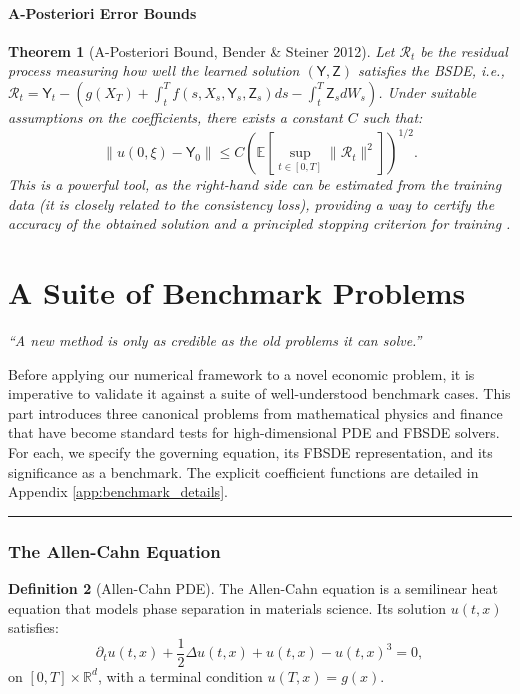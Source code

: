 \documentclass[11pt,letterpaper,oneside]{article}
\theoremstyle{plain}
\newtheorem{theorem}{Theorem}[section]
\theoremstyle{definition}
\newtheorem{definition}[theorem]{Definition}
\theoremstyle{remark}
\begin{document}
\subsection{A-Posteriori Error Bounds}
\begin{theorem}[A-Posteriori Bound, Bender \& Steiner 2012]
Let \(\mathcal{R}_t\) be the residual process measuring how well the learned solution \((\mathsf{Y}, \mathsf{Z})\) satisfies the BSDE, i.e., \(\mathcal{R}_t = \mathsf{Y}_t - \left( g(X_T) + \int_t^T f(s, X_s, \mathsf{Y}_s, \mathsf{Z}_s) ds - \int_t^T \mathsf{Z}_s dW_s \right)\). Under suitable assumptions on the coefficients, there exists a constant \(C\) such that:
\[
  \|u(0,\xi)-\mathsf{Y}_0\| \le C \left( \mathbb{E}\left[\sup_{t\in [0,T]}\|\mathcal{R}_t\|^2\right] \right)^{1/2}.
\]
This is a powerful tool, as the right-hand side can be estimated from the training data (it is closely related to the consistency loss), providing a way to certify the accuracy of the obtained solution and a principled stopping criterion for training \cite{BenderSteiner2012}.
\end{theorem}

\clearpage
\newpage
\part{A Suite of Benchmark Problems}
\label{part:benchmarks}

\begin{center}
\textit{“A new method is only as credible as the old problems it can solve.”}
\end{center}

Before applying our numerical framework to a novel economic problem, it is imperative to validate it against a suite of well-understood benchmark cases. This part introduces three canonical problems from mathematical physics and finance that have become standard tests for high-dimensional PDE and FBSDE solvers. For each, we specify the governing equation, its FBSDE representation, and its significance as a benchmark. The explicit coefficient functions are detailed in Appendix \ref{app:benchmark_details}.

\bigskip
\hrule
\bigskip

\section{The Allen-Cahn Equation}
\label{sec:allen_cahn}

\begin{definition}[Allen-Cahn PDE]
The Allen-Cahn equation is a semilinear heat equation that models phase separation in materials science. Its solution \(u(t,x)\) satisfies:
\begin{equation}
    \partial_t u(t,x) + \frac{1}{2}\Delta u(t,x) + u(t,x) - u(t,x)^3 = 0,
\end{equation}
on \([0,T] \times \mathbb{R}^d\), with a terminal condition \(u(T,x) = g(x)\).
\end{definition}
\end{document}
